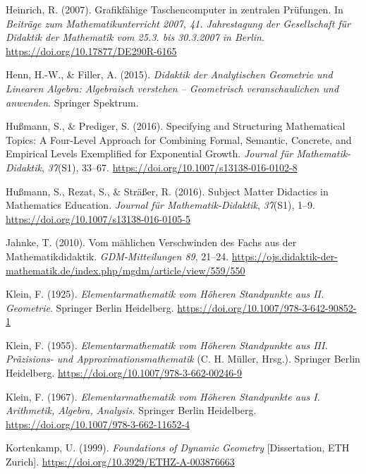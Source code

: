 \documentclass[
]{scrbook}
\newlength{\cslhangindent}
\newenvironment{CSLReferences}[2] %
 {\begin{list}{}{%
  \setlength{\itemindent}{0pt}
  \setlength{\leftmargin}{0pt}
  \setlength{\parsep}{0pt}
  \ifodd #1
   \setlength{\leftmargin}{\cslhangindent}
   \setlength{\itemindent}{-1\cslhangindent}
  \fi
  \setlength{\itemsep}{#2\baselineskip}}}
 {\end{list}}
\theoremstyle{definition}
\theoremstyle{definition}
\theoremstyle{definition}
\theoremstyle{definition}
\theoremstyle{remark}
\begin{document}
\begin{CSLReferences}{1}{0}
Heinrich, R. (2007). Grafikfähige {Taschencomputer} in zentralen {Prüfungen}. In \emph{Beiträge zum {Mathematikunterricht} 2007, 41. {Jahrestagung} der {Gesellschaft} für {Didaktik} der {Mathematik} vom 25.3. bis 30.3.2007 in {Berlin}}. \url{https://doi.org/10.17877/DE290R-6165}

Henn, H.-W., \& Filler, A. (2015). \emph{Didaktik der {Analytischen} {Geometrie} und {Linearen} {Algebra}: {Algebraisch} verstehen -- {Geometrisch} veranschaulichen und anwenden}. Springer Spektrum.

Hußmann, S., \& Prediger, S. (2016). Specifying and Structuring Mathematical Topics: A Four-Level Approach for Combining Formal, Semantic, Concrete, and Empirical Levels Exemplified for Exponential Growth. \emph{Journal für Mathematik-Didaktik}, \emph{37}(S1), 33--67. \url{https://doi.org/10.1007/s13138-016-0102-8}

Hußmann, S., Rezat, S., \& Sträßer, R. (2016). Subject {Matter} {Didactics} in {Mathematics} {Education}. \emph{Journal für Mathematik-Didaktik}, \emph{37}(S1), 1--9. \url{https://doi.org/10.1007/s13138-016-0105-5}

Jahnke, T. (2010). Vom mählichen {Verschwinden} des {Fachs} aus der {Mathematikdidaktik}. \emph{GDM-Mitteilungen 89}, 21--24. \url{https://ojs.didaktik-der-mathematik.de/index.php/mgdm/article/view/559/550}

Klein, F. (1925). \emph{Elementarmathematik vom {Höheren} {Standpunkte} aus {II}. {Geometrie}}. Springer Berlin Heidelberg. \url{https://doi.org/10.1007/978-3-642-90852-1}

Klein, F. (1955). \emph{Elementarmathematik vom {Höheren} {Standpunkte} aus {III}. {Präzisions}- und {Approximationsmathematik}} (C. H. Müller, Hrsg.). Springer Berlin Heidelberg. \url{https://doi.org/10.1007/978-3-662-00246-9}

Klein, F. (1967). \emph{Elementarmathematik vom {Höheren} {Standpunkte} aus {I}. {Arithmetik}, {Algebra}, {Analysis}}. Springer Berlin Heidelberg. \url{https://doi.org/10.1007/978-3-662-11652-4}

Kortenkamp, U. (1999). \emph{Foundations of {Dynamic} {Geometry}} {[}Dissertation, ETH Zurich{]}. \url{https://doi.org/10.3929/ETHZ-A-003876663}


\end{CSLReferences}
\end{document}

